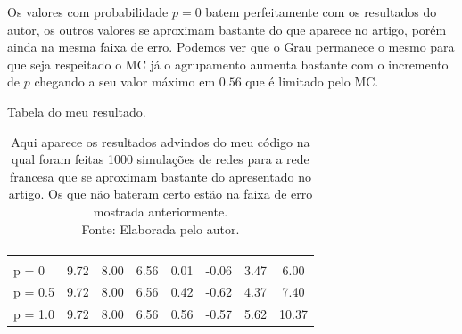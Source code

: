 \documentclass[12pt]{abnt-fisica11}%
\begin{document}
Os valores com probabilidade $p = 0$ batem perfeitamente com os resultados do autor, os outros valores se aproximam bastante do que aparece no artigo, porém ainda na mesma faixa de erro. Podemos ver que o Grau permanece o mesmo para que seja respeitado o MC já o agrupamento aumenta bastante com o incremento de $p$ chegando a seu valor máximo em $0.56$ que é limitado pelo MC.

\begin{table}[H]
  \centering

  \caption{Tabela do meu resultado.}
  \hspace*{-\leftmargin}\begin{tabular}{lccccccc}

    \hline

     & 
      & 
     &
     &
     & 
     & 
     & 
         \\

    \hline\\
    p = 0                               & 9.72                            & 8.00         & 6.56               & 0.01              & -0.06                         & 3.47                & 6.00     \\
    p = 0.5                             & 9.72                            & 8.00         & 6.56               & 0.42              & -0.62                         & 4.37                & 7.40     \\
    p = 1.0                             & 9.72                            & 8.00         & 6.56               & 0.56              & -0.57                         & 5.62                & 10.37   

  
\end{tabular}


  \caption*{Aqui aparece os resultados advindos do meu código na qual foram feitas 1000 simulações de redes para a rede francesa que se aproximam bastante do apresentado no artigo. Os que não bateram certo estão na faixa de erro mostrada anteriormente. \\Fonte: Elaborada pelo autor.}
\label{table:Miguel}
\end{table}
\end{document}
